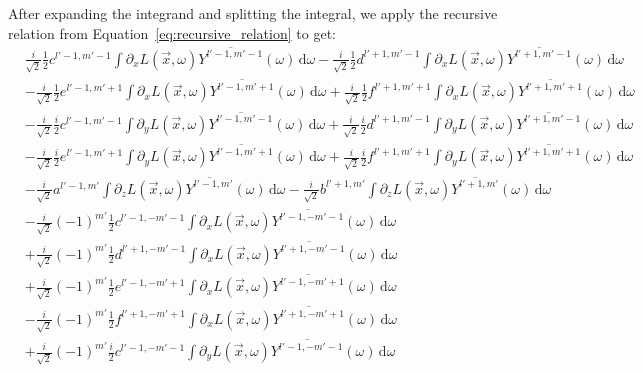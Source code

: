 \documentclass{egpubl}
\newcommand{\ud}{\,\mathrm{d}} %
\begin{document}
After expanding the integrand and splitting the integral, we apply the recursive relation from Equation~\ref{eq:recursive_relation} to get:
\begin{align*}
&
\frac{i}{\sqrt{2}}\frac{1}{2}c^{{l'-1,m'-1}}\int{\partial_xL\left (\vec{x} ,\omega \right )\overline{Y^{l'-1, m'-1}}(\omega )\ud\omega}
-\frac{i}{\sqrt{2}}\frac{1}{2}d^{{l'+1,m'-1}}\int{\partial_xL\left (\vec{x} ,\omega \right )\overline{Y^{l'+1, m'-1}}(\omega )\ud\omega}
\\&
-\frac{i}{\sqrt{2}}\frac{1}{2}e^{{l'-1,m'+1}}\int{\partial_xL\left (\vec{x} ,\omega \right )\overline{Y^{l'-1, m'+1}}(\omega )\ud\omega}
+\frac{i}{\sqrt{2}}\frac{1}{2}f^{{l'+1,m'+1}}\int{\partial_xL\left (\vec{x} ,\omega \right )\overline{Y^{l'+1, m'+1}}(\omega )\ud\omega}
\\&
-\frac{i}{\sqrt{2}}\frac{i}{2}c^{{l'-1,m'-1}}\int{\partial_yL\left (\vec{x} ,\omega \right )\overline{Y^{l'-1, m'-1}}(\omega )\ud\omega}
+\frac{i}{\sqrt{2}}\frac{i}{2}d^{{l'+1,m'-1}}\int{\partial_yL\left (\vec{x} ,\omega \right )\overline{Y^{l'+1, m'-1}}(\omega )\ud\omega}
\\&
-\frac{i}{\sqrt{2}}\frac{i}{2}e^{{l'-1,m'+1}}\int{\partial_yL\left (\vec{x} ,\omega \right )\overline{Y^{l'-1, m'+1}}(\omega )\ud\omega}
+\frac{i}{\sqrt{2}}\frac{i}{2}f^{{l'+1,m'+1}}\int{\partial_yL\left (\vec{x} ,\omega \right )\overline{Y^{l'+1, m'+1}}(\omega )\ud\omega}
\\&
-\frac{i}{\sqrt{2}}a^{{l'-1,m'}}\int{\partial_zL\left (\vec{x} ,\omega \right )\overline{Y^{l'-1, m'}}(\omega )\ud\omega}
-\frac{i}{\sqrt{2}}b^{{l'+1,m'}}\int{\partial_zL\left (\vec{x} ,\omega \right )\overline{Y^{l'+1, m'}}(\omega )\ud\omega}
\\&
-\frac{i}{\sqrt{2}}\left({-1}\right)^{m'}\frac{1}{2}c^{{l'-1,-m'-1}}\int{\partial_xL\left (\vec{x} ,\omega \right )\overline{Y^{l'-1, -m'-1}}(\omega )\ud\omega}
\\&
+\frac{i}{\sqrt{2}}\left({-1}\right)^{m'}\frac{1}{2}d^{{l'+1,-m'-1}}\int{\partial_xL\left (\vec{x} ,\omega \right )\overline{Y^{l'+1, -m'-1}}(\omega )\ud\omega}
\\&
+\frac{i}{\sqrt{2}}\left({-1}\right)^{m'}\frac{1}{2}e^{{l'-1,-m'+1}}\int{\partial_xL\left (\vec{x} ,\omega \right )\overline{Y^{l'-1, -m'+1}}(\omega )\ud\omega}
\\&
-\frac{i}{\sqrt{2}}\left({-1}\right)^{m'}\frac{1}{2}f^{{l'+1,-m'+1}}\int{\partial_xL\left (\vec{x} ,\omega \right )\overline{Y^{l'+1, -m'+1}}(\omega )\ud\omega}
\\&
+\frac{i}{\sqrt{2}}\left({-1}\right)^{m'}\frac{i}{2}c^{{l'-1,-m'-1}}\int{\partial_yL\left (\vec{x} ,\omega \right )\overline{Y^{l'-1, -m'-1}}(\omega )\ud\omega}

\end{align*}
\end{document}
